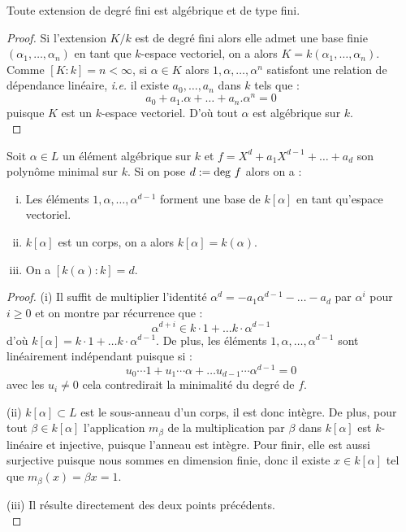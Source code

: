 \documentclass[a4paper]{article} %
\numberwithin{equation}{section}
\begin{document}
{\begin{prop}
Toute extension de degré fini est algébrique et de type fini.
\end{prop}
\begin{proof}
Si l'extension $K/k$ est de degré fini alors elle admet une base finie $(\alpha_1,\dots,\alpha_n)$ en tant que $k$-espace vectoriel, on a alors $K = k(\alpha_1,\dots,\alpha_n)$. Comme $[K:k] = n < \infty$, si $\alpha\in K$ alors $1, \alpha, \dots, \alpha^n$ satisfont une relation de dépendance linéaire, \textit{i.e.} il existe $a_0, \dots, a_n$ dans $k$ tels que :
\[a_0 + a_1.\alpha + \dots + a_n.\alpha^n = 0\]
puisque $K$ est un $k$-espace vectoriel. D'où tout $\alpha$ est algébrique sur $k$.\\
\end{proof}

\begin{prop}
Soit $\alpha\in L$ un élément algébrique sur $k$ et $f = X^d + a_1X^{d-1} + \dots + a_d$ son polynôme minimal sur $k$. Si on pose $d := \textup{deg }f$ alors on a :
\begin{enumerate}[(i)]
\item Les éléments $1, \alpha,\dots,\alpha^{d-1}$ forment une base de $k[\alpha]$ en tant qu'espace vectoriel.
\item $k[\alpha]$ est un corps, on a alors $k[\alpha] = k(\alpha)$.
\item On a $[k(\alpha):k] = d$.
\end{enumerate}
\end{prop}
\begin{proof}
(i) Il suffit de multiplier l'identité $\alpha^d = -a_1\alpha^{d-1} - \dots - a_d$ par $\alpha^i$ pour $i\geq0$ et on montre par récurrence que :
\[\alpha^{d+i} \in k\cdot1 + \dots k\cdot\alpha^{d-1}\]
d'où $k[\alpha] = k\cdot1 + \dots k\cdot\alpha^{d-1}$. De plus, les éléments $1,\alpha,\dots,\alpha^{d-1}$ sont linéairement indépendant puisque si :
\[u_0\cdots1 + u_1\cdots\alpha + \dots u_{d-1}\cdots\alpha^{d-1} = 0\]
avec les $u_i\neq0$ cela contredirait la minimalité du degré de $f$.\par
(ii) $k[\alpha] \subset L$ est le sous-anneau d'un corps, il est donc intègre. De plus, pour tout $\beta\in k[\alpha]$ l'application $m_{\beta}$ de la multiplication par $\beta$ dans $k[\alpha]$ est $k$-linéaire et injective, puisque l'anneau est intègre. Pour finir, elle est aussi surjective puisque nous sommes en dimension finie, donc il existe $x\in k[\alpha]$ tel que $m_{\beta}(x) = \beta x = 1$.\par
(iii) Il résulte directement des deux points précédents.\\
\end{proof}

}
\end{document}
